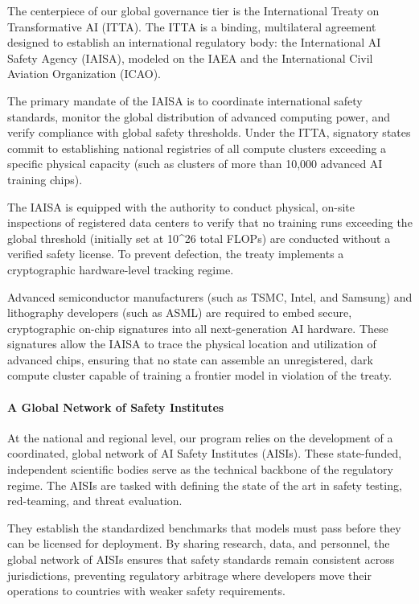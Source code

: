 The centerpiece of our global governance tier is the International
Treaty on Transformative AI (ITTA). The ITTA is a binding, multilateral
agreement designed to establish an international regulatory body: the
International AI Safety Agency (IAISA), modeled on the IAEA and the
International Civil Aviation Organization (ICAO).

The primary mandate of the IAISA is to coordinate international safety
standards, monitor the global distribution of advanced computing power,
and verify compliance with global safety thresholds. Under the ITTA,
signatory states commit to establishing national registries of all
compute clusters exceeding a specific physical capacity (such as
clusters of more than 10,000 advanced AI training chips).

The IAISA is equipped with the authority to conduct physical, on-site
inspections of registered data centers to verify that no training runs
exceeding the global threshold (initially set at 10\^{}26 total FLOPs)
are conducted without a verified safety license. To prevent defection,
the treaty implements a cryptographic hardware-level tracking regime.

Advanced semiconductor manufacturers (such as TSMC, Intel, and Samsung)
and lithography developers (such as ASML) are required to embed secure,
cryptographic on-chip signatures into all next-generation AI hardware.
These signatures allow the IAISA to trace the physical location and
utilization of advanced chips, ensuring that no state can assemble an
unregistered, dark compute cluster capable of training a frontier model
in violation of the treaty.

\paragraph{A Global Network of Safety
Institutes}\label{a-global-network-of-safety-institutes}

At the national and regional level, our program relies on the
development of a coordinated, global network of AI Safety Institutes
(AISIs). These state-funded, independent scientific bodies serve as the
technical backbone of the regulatory regime. The AISIs are tasked with
defining the state of the art in safety testing, red-teaming, and threat
evaluation.

They establish the standardized benchmarks that models must pass before
they can be licensed for deployment. By sharing research, data, and
personnel, the global network of AISIs ensures that safety standards
remain consistent across jurisdictions, preventing regulatory arbitrage
where developers move their operations to countries with weaker safety
requirements.

